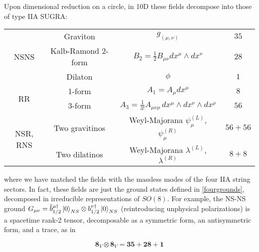 Upon dimensional reduction on a circle, in 10D these fields decompose into those of type IIA SUGRA:

%

\begin{center}
	\begin{tabular}{|c|c|c|c|}
		\hline
		\multirow{3}{*}{NSNS} 
	&	Graviton	& $g_{(\mu,\nu)}$ 							& $35$\\
	&	Kalb-Ramond 2-form & $B_2 = \frac{1}{2} B_{\mu\nu} dx^\mu \wedge dx^\nu$ & $28$ \\
	&	Dilaton & $\phi$ & $1$ \\
		\hline \hline
		\multirow{2}{*}{RR} 
	&	1-form		& $A_1 = A_{\mu} dx^\mu$ & $8$\\
	&	3-form		& $A_3 = \frac{1}{3!} A_{\mu\nu\rho} \, dx^\mu \wedge dx^\nu \wedge dx^\rho$ & $56$\\
		\hline \hline 
		\multirow{2}{*}{NSR, RNS}
	&	Two gravitinos	& Weyl-Majorana $\psi_\mu^{(L)}$, $\psi_\mu^{(R)}$ 	& $56+56$\\
	&	Two dilatinos	& Weyl-Majorana $\lambda^{(L)}$, $\lambda^{(R)}$ 	& $8+8$\\
		\hline
	\end{tabular}
\end{center}

where we have matched the fields with the massless modes of the four IIA string sectors. In fact, these fields are just the ground states defined in \eqref{fourgrounds}, decomposed in irreducible representations of $SO(8)$. For example, the NS-NS ground $G_{\mu\nu} = \tilde{b}_{1/2}^{\mu\dagger} \ket{0}_{NS} \otimes b_{1/2}^{\nu\dagger} \ket{0}_{NS}$ (reintroducing unphysical polarizations) is a spacetime rank-2 tensor, decomposable as a symmetric form, an antisymmetric form, and a trace, as in

\begin{equation}
	\mathbf{8}_V \otimes \mathbf{8}_V = \mathbf{35} +  \mathbf{28} + \mathbf{1} 	\label{}
\end{equation}

